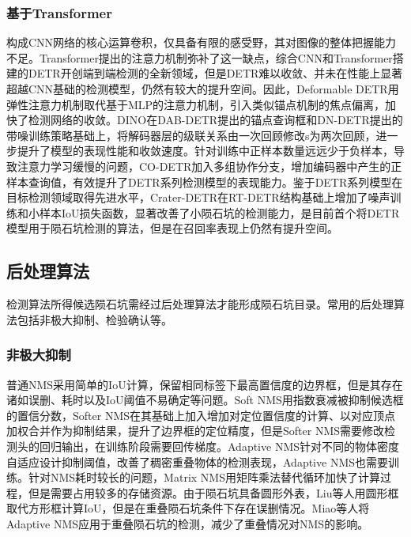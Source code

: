 \subsubsection{基于Transformer}
构成CNN网络的核心运算卷积，仅具备有限的感受野，其对图像的整体把握能力不足。Transformer提出的注意力机制\cite{vaswaniAttentionAllYou2017}弥补了这一缺点，综合CNN和Transformer搭建的DETR\cite{carionEndtoendObjectDetection2020}开创端到端检测的全新领域，但是DETR难以收敛、并未在性能上显著超越CNN基础的检测模型，仍然有较大的提升空间。因此，Deformable DETR\cite{zhuDeformableDETRDeformable2021}用弹性注意力机制取代基于MLP的注意力机制，引入类似锚点机制的焦点偏离，加快了检测网络的收敛。DINO\cite{zhangDINODETRImproved2023}在DAB-DETR\cite{liuDABDETRDynamicAnchor2022}提出的锚点查询框和DN-DETR\cite{liDNDETRAccelerateDETR}提出的带噪训练策略基础上，将解码器层的级联关系由一次回顾修改s为两次回顾，进一步提升了模型的表现性能和收敛速度。针对训练中正样本数量远远少于负样本，导致注意力学习缓慢的问题，CO-DETR\cite{zongDETRsCollaborativeHybrid2023}加入多组协作分支，增加编码器中产生的正样本查询值，有效提升了DETR系列检测模型的表现能力。鉴于DETR系列模型在目标检测领域取得先进水平，Crater-DETR\cite{guoCraterDETRNovelTransformer2024}在RT-DETR\cite{zhaoDETRsBeatYOLOs2024}结构基础上增加了噪声训练和小样本IoU损失函数，显著改善了小陨石坑的检测能力，是目前首个将DETR模型用于陨石坑检测的算法，但是在召回率表现上仍然有提升空间。
\subsection{后处理算法}
检测算法所得候选陨石坑需经过后处理算法才能形成陨石坑目录。常用的后处理算法包括非极大抑制、检验确认等。
\subsubsection{非极大抑制}
普通NMS采用简单的IoU计算，保留相同标签下最高置信度的边界框，但是其存在诸如误删、耗时以及IoU阈值不易确定等问题。Soft NMS\cite{bodlaSoftNMSImprovingObject2017}用指数衰减被抑制候选框的置信分数，Softer NMS\cite{heSofterNMSRethinkingBounding2018}在其基础上加入增加对定位置信度的计算、以对应顶点加权合并作为抑制结果，提升了边界框的定位精度，但是Softer NMS需要修改检测头的回归输出，在训练阶段需要回传梯度。Adaptive NMS\cite{liuAdaptiveNMSRefining2019}针对不同的物体密度自适应设计抑制阈值，改善了稠密重叠物体的检测表现，Adaptive NMS也需要训练。针对NMS耗时较长的问题，Matrix NMS\cite{wangSOLOSimpleFramework2021}用矩阵乘法替代循环加快了计算过程，但是需要占用较多的存储资源。由于陨石坑具备圆形外表，Liu\cite{liuIdentificationLunarCraters2024}等人用圆形框取代方形框计算IoU，但是在重叠陨石坑条件下存在误删情况。Miao\cite{miaoLCDNetInnovativeNeural2024}等人将Adaptive NMS应用于重叠陨石坑的检测，减少了重叠情况对NMS的影响。
